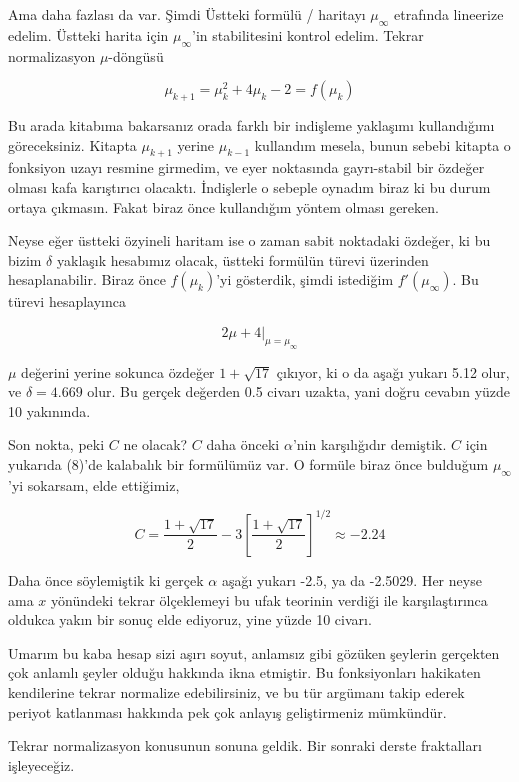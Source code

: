 \documentclass[12pt,fleqn]{article}\usepackage{../../common}
\begin{document}
Ama daha fazlası da var. Şimdi Üstteki formülü / haritayı $\mu_\infty$ etrafında
lineerize edelim. Üstteki harita için $\mu_\infty$'in stabilitesini kontrol
edelim. Tekrar normalizasyon $\mu$-döngüsü

$$ \mu_{k+1}=\mu_k^2 + 4\mu_k - 2 = f(\mu_k)$$

Bu arada kitabıma bakarsanız orada farklı bir indişleme yaklaşımı kullandığımı
göreceksiniz. Kitapta $\mu_{k+1}$ yerine $\mu_{k-1}$ kullandım mesela, bunun
sebebi kitapta o fonksiyon uzayı resmine girmedim, ve eyer noktasında
gayrı-stabil bir özdeğer olması kafa karıştırıcı olacaktı. İndişlerle o sebeple
oynadım biraz ki bu durum ortaya çıkmasın. Fakat biraz önce kullandığım yöntem
olması gereken.

Neyse eğer üstteki özyineli haritam ise o zaman sabit noktadaki özdeğer, ki bu
bizim $\delta$ yaklaşık hesabımız olacak, üstteki formülün türevi üzerinden
hesaplanabilir. Biraz önce $f(\mu_k)$'yi gösterdik, şimdi istediğim
$f'(\mu_\infty)$. Bu türevi hesaplayınca

$$ 2\mu + 4 |_{\mu = \mu_\infty} $$

$\mu$ değerini yerine sokunca özdeğer $1 + \sqrt{17}$ çıkıyor, ki o da aşağı
yukarı 5.12 olur, ve $\delta = 4.669$ olur. Bu gerçek değerden 0.5 civarı
uzakta, yani doğru cevabın yüzde 10 yakınında.

Son nokta, peki $C$ ne olacak? $C$ daha önceki $\alpha$'nin karşılığıdır
demiştik. $C$ için yukarıda (8)'de kalabalık bir formülümüz var. O formüle biraz
önce bulduğum $\mu_\infty$'yi sokarsam, elde ettiğimiz,

$$
C = \frac{1 + \sqrt{17}}{2} - 3 \left[ \frac{1 + \sqrt{17}}{2}  \right]^{1/2}
\approx -2.24
$$

Daha önce söylemiştik ki gerçek $\alpha$ aşağı yukarı -2.5, ya da -2.5029. Her
neyse ama $x$ yönündeki tekrar ölçeklemeyi bu ufak teorinin verdiği ile
karşılaştırınca oldukca yakın bir sonuç elde ediyoruz, yine yüzde 10 civarı.

Umarım bu kaba hesap sizi aşırı soyut, anlamsız gibi gözüken şeylerin
gerçekten çok anlamlı şeyler olduğu hakkında ikna etmiştir. Bu fonksiyonları
hakikaten kendilerine tekrar normalize edebilirsiniz, ve bu tür argümanı
takip ederek periyot katlanması hakkında pek çok anlayış geliştirmeniz
mümkündür.

Tekrar normalizasyon konusunun sonuna geldik. Bir sonraki derste fraktalları
işleyeceğiz.
\end{document}
